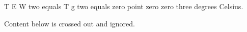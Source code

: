 T E W two equals T g two equals zero point zero zero three degrees Celsius.  

Content below is crossed out and ignored.